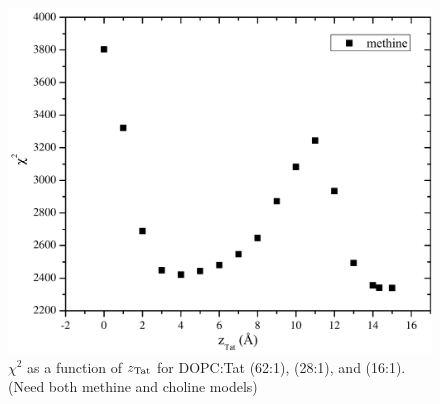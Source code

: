 \begin{figure}[htbp]
  \includegraphics[scale=0.3]{figures/Tat/SDP_Results/X2/DOPC_Tat_16to1_3p0_X2}
  \caption{$\chi^2$ as a function of $z_\textrm{Tat}$ for DOPC:Tat (62:1), (28:1), 
  and (16:1). (Need both methine and choline models)}
  \label{fig:DOPC_Tat_X2}
\end{figure}
